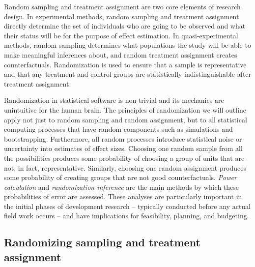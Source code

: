 Random sampling and treatment assignment are two core elements of research design.
In experimental methods, random sampling and treatment assignment directly determine
the set of individuals who are going to be observed
and what their status will be for the purpose of effect estimation.
In quasi-experimental methods, random sampling determines what populations the study
will be able to make meaningful inferences about,
and random treatment assignment creates counterfactuals.
Randomization 
is used to ensure that a sample is representative and
that any treatment and control groups are statistically indistinguishable
after treatment assignment.

Randomization in statistical software is non-trivial
and its mechanics are unintuitive for the human brain.
The principles of randomization we will outline
apply not just to random sampling and random assignment,
but to all statistical computing processes that have random components
such as simulations and bootstrapping.
Furthermore, all random processes introduce statistical noise
or uncertainty into estimates of effect sizes.
Choosing one random sample from all the possibilities produces some probability of
choosing a group of units that are not, in fact, representative.
Similarly, choosing one random assignment produces some probability of
creating groups that are not good counterfactuals.
\textit{Power calculation} and \textit{randomization inference}
are the main methods by which these probabilities of error are assessed.
These analyses are particularly important in the initial phases of development research --
typically conducted before any actual field work occurs --
and have implications for feasibility, planning, and budgeting.

\subsection{Randomizing sampling and treatment assignment}

